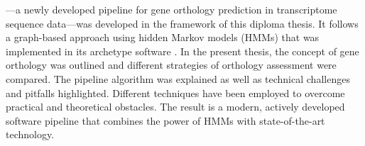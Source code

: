 \pname---a newly developed pipeline for gene orthology prediction in
transcriptome sequence data---was developed in the framework of this diploma
thesis. It follows a graph-based approach using hidden Markov models (HMMs) that
was implemented in its archetype software \hamstr. In the present thesis, the
concept of gene orthology was outlined and different strategies of orthology
assessment were compared. The pipeline algorithm was explained as well as
technical challenges and pitfalls highlighted. Different techniques have been
employed to overcome practical and theoretical obstacles. The result is a
modern, actively developed software pipeline that combines the power of HMMs
with state-of-the-art technology.

